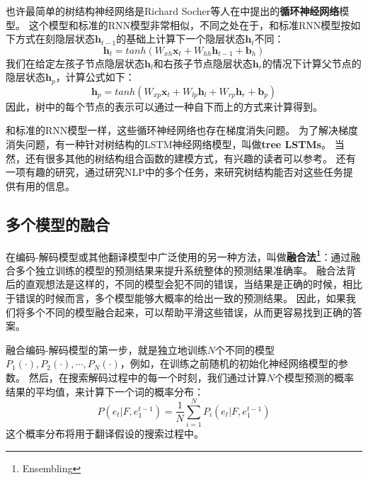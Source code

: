 \documentclass[10pt,a4paper]{ctexart}
\begin{document}
也许最简单的树结构神经网络是Richard Socher等人在\cite{socher2011parsing}中提出的\textbf{循环神经网络}模型。
这个模型和标准的RNN模型非常相似，不同之处在于，和标准RNN模型按如下方式在刻隐层状态$\textbf{h}_{t-1}$的基础上计算下一个隐层状态$\textbf{h}_t$不同：
\begin{equation}\label{eq:69}
 \textbf{h}_t = tanh(W_{xh}\textbf{x}_t + W_{hh}\textbf{h}_{t-1} + \textbf{b}_h)
\end{equation}
我们在给定左孩子节点隐层状态$\textbf{h}_l$和右孩子节点隐层状态$\textbf{h}_r$的情况下计算父节点的隐层状态$\textbf{h}_p$，计算公式如下：
\begin{equation}\label{eq:70}
 \textbf{h}_p = tanh(W_{xp}\textbf{x}_t + W_{lp}\textbf{h}_l + W_{rp}\textbf{h}_r + \textbf{b}_p)
\end{equation}
因此，树中的每个节点的表示可以通过一种自下而上的方式来计算得到。

和标准的RNN模型一样，这些循环神经网络也存在梯度消失问题。
为了解决梯度消失问题，有一种针对树结构的LSTM神经网络模型，叫做\textbf{tree LSTMs}\cite{tai2015improved}。
当然，还有很多其他的树结构组合函数的建模方式，有兴趣的读者可以参考\cite{socher2013parsing,dyer2015transition,dyer2016recurrent}。
还有一项有趣的研究\cite{li2015tree}，通过研究NLP中的多个任务，来研究树结构能否对这些任务提供有用的信息。

\subsection{多个模型的融合}
在编码-解码模型或其他翻译模型中广泛使用的另一种方法，叫做\textbf{融合法\footnote{Ensembling}}：通过融合多个独立训练的模型的预测结果来提升系统整体的预测结果准确率。
融合法背后的直观想法是这样的，不同的模型会犯不同的错误，当结果是正确的时候，相比于错误的时候而言，多个模型能够大概率的给出一致的预测结果。
因此，如果我们将多个不同的模型融合起来，可以帮助平滑这些错误，从而更容易找到正确的答案。

融合编码-解码模型的第一步，就是独立地训练$N$个不同的模型$P_1(\cdot),P_2(\cdot),\cdots,P_N(\cdot)$，例如，在训练之前随机的初始化神经网络模型的参数。
然后，在搜索解码过程中的每一个时刻，我们通过计算$N$个模型预测的概率结果的平均值，来计算下一个词的概率分布：
\begin{equation}\label{eq:71}
 P(e_t | F,e_1^{t-1}) = \frac{1}{N} \sum_{i=1}^{N} P_i(e_t | F,e_1^{t-1})
\end{equation}
这个概率分布将用于翻译假设的搜索过程中。

\end{document}
